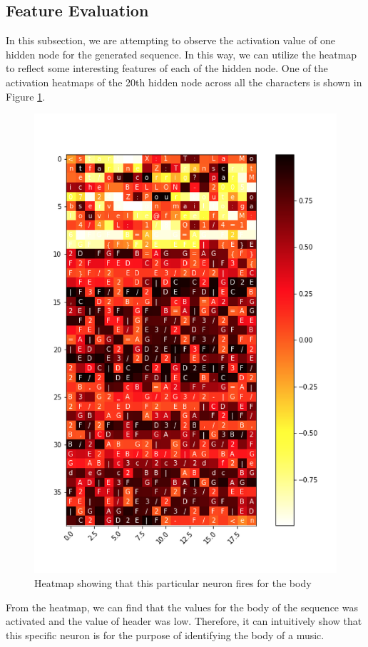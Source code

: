 \documentclass{article}
\begin{document}
\subsection{Feature Evaluation}
In this subsection, we are attempting to observe the activation value of one hidden node for the generated sequence. In this way, we can utilize the heatmap to reflect some interesting features of each of the hidden node. One of the activation heatmaps of the 20th hidden node across all the characters is shown in Figure \ref{figure: heatmap}.
\begin{figure}[H]
\begin{center}
\includegraphics[scale=0.5]{image/heatmap.png}
\end{center}
\caption{Heatmap showing that this particular neuron fires for the body}
\label{figure: heatmap}
\end{figure}
From the heatmap, we can find that the values for the body of the sequence was activated and the value of header was low. Therefore, it can intuitively show that this specific neuron is for the purpose of identifying the body of a music.
\end{document}
